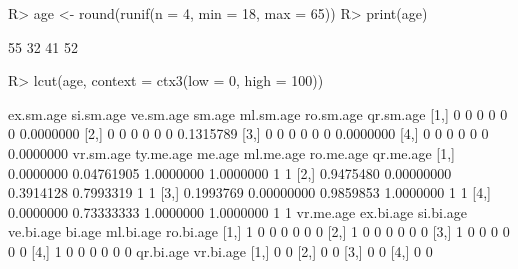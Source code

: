 \begin{Schunk}
% --begin: "lcut.numeric"
\begin{Sinput}
R> age <- round(runif(n = 4, min = 18, max = 65))
R> print(age)
\end{Sinput}
\begin{Soutput}
[1] 55 32 41 52
\end{Soutput}
\begin{Sinput}
R> lcut(age, context = ctx3(low = 0, high = 100))
\end{Sinput}
\begin{Soutput}
     ex.sm.age si.sm.age ve.sm.age sm.age ml.sm.age ro.sm.age qr.sm.age
[1,]         0         0         0      0         0         0 0.0000000
[2,]         0         0         0      0         0         0 0.1315789
[3,]         0         0         0      0         0         0 0.0000000
[4,]         0         0         0      0         0         0 0.0000000
     vr.sm.age  ty.me.age    me.age ml.me.age ro.me.age qr.me.age
[1,] 0.0000000 0.04761905 1.0000000 1.0000000         1         1
[2,] 0.9475480 0.00000000 0.3914128 0.7993319         1         1
[3,] 0.1993769 0.00000000 0.9859853 1.0000000         1         1
[4,] 0.0000000 0.73333333 1.0000000 1.0000000         1         1
     vr.me.age ex.bi.age si.bi.age ve.bi.age bi.age ml.bi.age ro.bi.age
[1,]         1         0         0         0      0         0         0
[2,]         1         0         0         0      0         0         0
[3,]         1         0         0         0      0         0         0
[4,]         1         0         0         0      0         0         0
     qr.bi.age vr.bi.age
[1,]         0         0
[2,]         0         0
[3,]         0         0
[4,]         0         0
\end{Soutput}
%
% --end: "lcut.numeric"
\end{Schunk}
